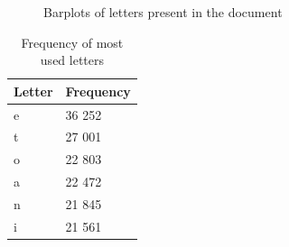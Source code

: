 \documentclass[10pt,leter,openany]{article}
\begin{document}
	
	\begin{figure}

		\centering
		
		\caption{Barplots of letters present in the document} \label{fig:barplot_letters}

\end{figure}

\begin{table}[]
	\centering
	\caption{Frequency of most used letters}
	\label{tab:my-table1}
	\begin{tabular}{@{}ll@{}}
		\toprule
		Letter & Frequency \\ \midrule
		e      & 36 252    \\
		t      & 27 001    \\
		o      & 22 803    \\
		a      & 22 472    \\
		n      & 21 845    \\
		i      & 21 561    \\ \bottomrule
	\end{tabular}
\end{table}
\end{document}
